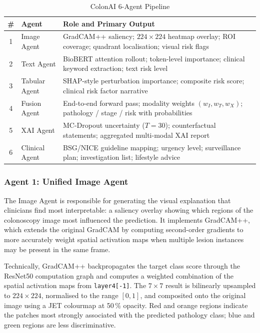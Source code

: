 \documentclass[conference]{IEEEtran}
\begin{document}
\begin{table}[t]
\centering
\caption{ColonAI 6-Agent Pipeline}
\small\setlength{\tabcolsep}{3pt}
\begin{tabular}{c p{1.9cm} p{5.0cm}}
\toprule
\textbf{\#} & \textbf{Agent} & \textbf{Role and Primary Output}\\\midrule
1 & Image Agent   & GradCAM++ saliency; $224\!\times\!224$ heatmap overlay; ROI coverage; quadrant localisation; visual risk flags \\[3pt]
2 & Text Agent    & BioBERT attention rollout; token-level importance; clinical keyword extraction; text risk level \\[3pt]
3 & Tabular Agent & SHAP-style perturbation importance; composite risk score; clinical risk factor narrative \\[3pt]
4 & Fusion Agent  & End-to-end forward pass; modality weights $(w_I,w_T,w_X)$; pathology / stage / risk with probabilities \\[3pt]
5 & XAI Agent     & MC-Dropout uncertainty ($T\!=\!30$); counterfactual statements; aggregated multi-modal XAI report \\[3pt]
6 & Clinical Agent & BSG/NICE guideline mapping; urgency level; surveillance plan; investigation list; lifestyle advice \\\bottomrule
\end{tabular}
\end{table}

\subsubsection{Agent 1: Unified Image Agent}

The Image Agent is responsible for generating the visual explanation that
clinicians find most interpretable: a saliency overlay showing which regions
of the colonoscopy image most influenced the prediction. It implements
GradCAM++, which extends the original GradCAM by computing second-order
gradients to more accurately weight spatial activation maps when multiple
lesion instances may be present in the same frame.

Technically, GradCAM++ backpropagates the target class score through the
ResNet50 computation graph and computes a weighted combination of the spatial
activation maps from \texttt{layer4[-1]}. The $7\!\times\!7$ result is
bilinearly upsampled to $224\!\times\!224$, normalised to the range $[0,1]$,
and composited onto the original image using a JET colourmap at 50\,\% opacity.
Red and orange regions indicate the patches most strongly associated with the
predicted pathology class; blue and green regions are less discriminative.
\end{document}
